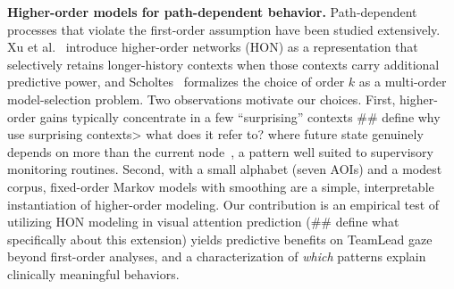 \documentclass[runningheads]{llncs}
\begin{document}
\textbf{Higher-order models for path-dependent behavior.}
Path-dependent processes that violate the first-order assumption have been studied extensively. Xu et al.~\cite{xuRepresentingHigherorderDependencies2016} introduce higher-order networks (HON) as a representation that selectively retains longer-history contexts when those contexts carry additional predictive power, and Scholtes~\cite{scholtesWhenNetworkNetwork2017} formalizes the choice of order $k$ as a multi-order model-selection problem. Two observations motivate our choices. First, higher-order gains typically concentrate in a few ``surprising'' contexts 
## define why use surprising contexts> what does it refer to?
where future state genuinely depends on more than the current node~\cite{xuRepresentingHigherorderDependencies2016,scholtesWhenNetworkNetwork2017}, a pattern well suited to supervisory monitoring routines. Second, with a small alphabet (seven AOIs) and a modest corpus, fixed-order Markov models with smoothing are a simple, interpretable instantiation of higher-order modeling. Our contribution is an empirical test of utilizing HON modeling in visual attention prediction (## define what specifically about this extension) yields predictive benefits on TeamLead gaze beyond first-order analyses, and a characterization of \emph{which} patterns explain clinically meaningful behaviors.
\end{document}
